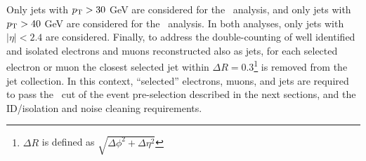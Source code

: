 Only jets with $p_{\text{T}} > 30$ GeV are considered
for the \eejj~analysis, and only jets with $p_{\text{T}} > 40$ GeV
are considered for the \enujj~analysis.  In both analyses,
only jets with $|\eta| < 2.4$ are considered.
Finally, to address the double-counting of well identified and isolated 
electrons and muons reconstructed also as jets, for each selected electron 
or muon the closest selected jet within 
$\Delta R=0.3$\footnote{$\Delta R$ is defined as $\sqrt{\Delta\phi^2+\Delta\eta^2}$}
is removed from the jet collection.  In this context,
``selected'' electrons, muons, and jets are required to pass the \pt~cut of 
the event pre-selection described in the next sections, 
and the ID/isolation and noise cleaning requirements.

